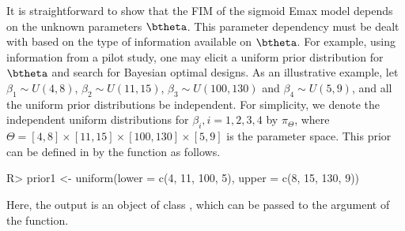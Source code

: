 It  is straightforward to show that the  FIM of the sigmoid Emax model depends on the unknown parameters $\btheta$. This parameter dependency must be dealt with based on the  type of information available on $\btheta$.
For example, using information from a  pilot study,  one may elicit a uniform prior distribution  for $\btheta$ and search for Bayesian optimal designs.
As an illustrative example, let $\beta_1 \sim U(4, 8)$, $\beta_2 \sim U(11, 15)$, $\beta_3 \sim U(100, 130)$ and $\beta_4 \sim U(5, 9)$,  and all the uniform prior distributions be independent.
For simplicity,  we denote the independent uniform distributions for $\beta_i, i = 1, 2,3, 4$ by $\pi_{\Theta}$,   where $\Theta = [4, 8] \times [11, 15] \times[100,130] \times [5, 9] $ is the parameter space. This prior can be defined in  by the   function as follows.
\begin{example}
R> prior1 <- uniform(lower = c(4, 11, 100, 5), upper = c(8, 15, 130, 9))
\end{example}
Here, the output is an object  of class , which can be passed to the argument  of  the  function.


